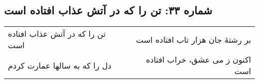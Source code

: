 \begin{center}
\section*{شماره ۳۳: تن را که در آتش عذاب افتاده است}
\label{sec:033}
\begin{longtable}{l p{0.5cm} r}
تن را که در آتش عذاب افتاده است
&&
بر رشتهٔ جان هزار تاب افتاده است
\\
دل را که به سالها عمارت کردم
&&
اکنون ز می عشق، خراب افتاده است
\\
\end{longtable}
\end{center}
